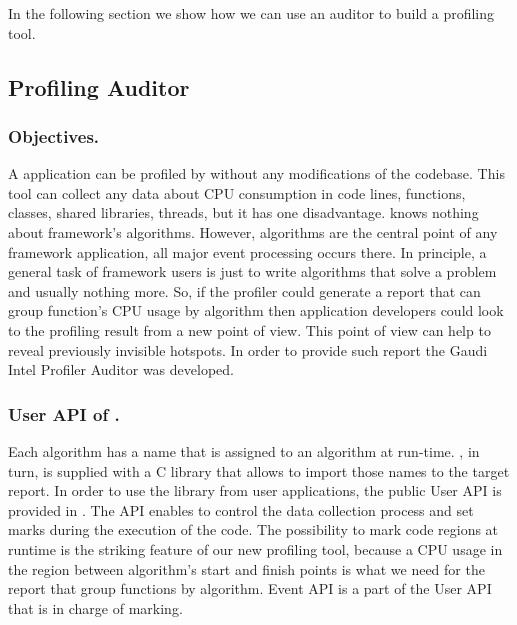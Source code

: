 In the following section we show how we can use an auditor to build a profiling
tool.

\subsection{Profiling Auditor}

\subsubsection{Objectives.}

A \gaudi application can be profiled by \amp  without any modifications of the
codebase.  This tool can collect any data about CPU consumption in code lines,
functions, classes, shared libraries, threads, but it has one disadvantage.
\amp knows nothing about \gaudi framework's algorithms. However, algorithms are
the central point of any framework application, all major event processing
occurs there. In principle, a general task of framework users is just to write
algorithms that solve a problem and usually nothing more. So, if the profiler
could generate a report that can group function's CPU usage by algorithm then
application developers could look to the profiling result from a new point of
view. This point of view can help to reveal previously invisible hotspots. In
order to provide such report the Gaudi Intel Profiler Auditor was developed.

\subsubsection{User API of \iamp.}

Each \gaudi algorithm has a name that is assigned to an algorithm at run-time.
\amp, in turn, is supplied with a C library that allows to import those names
to the target report. In order to use the library from user applications, the
public User API is provided in \amp. The API enables to control the data
collection process and set marks during the execution of the code. The
possibility to mark code regions at runtime is the striking feature of our new
profiling tool, because a CPU usage in the region between algorithm's start and
finish points is what we need for the report that group functions by algorithm.
Event API is a part of the User API  that is in charge of marking.

